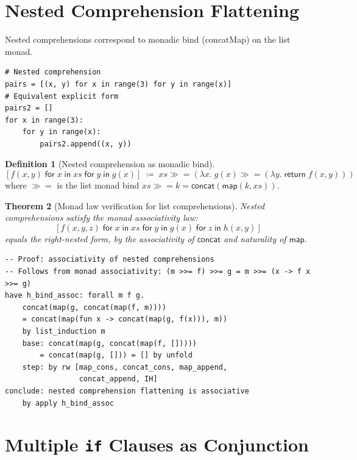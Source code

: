 \documentclass[11pt,a4paper]{report}
\theoremstyle{definition}
\newtheorem{definition}{Definition}[chapter]
\theoremstyle{plain}
\newtheorem{theorem}[definition]{Theorem}
\newcommand{\defeq}{\coloneqq}
\begin{document}
\section{Nested Comprehension Flattening}

Nested comprehensions correspond to monadic bind (concatMap) on the list
monad.

\begin{lstlisting}[style=python]
# Nested comprehension
pairs = [(x, y) for x in range(3) for y in range(x)]
# Equivalent explicit form
pairs2 = []
for x in range(3):
    for y in range(x):
        pairs2.append((x, y))
\end{lstlisting}

\begin{definition}[Nested comprehension as monadic bind]
\[
  [f(x,y) \;\mathsf{for}\; x \;\mathsf{in}\; \mathit{xs}
    \;\mathsf{for}\; y \;\mathsf{in}\; g(x)]
  \;\defeq\;
  \mathit{xs} \mathbin{\gg\!=} (\lambda x.\; g(x) \mathbin{\gg\!=}
    (\lambda y.\; \mathsf{return}\; f(x,y)))
\]
where $\gg\!=$ is the list monad bind
$\mathit{xs} \mathbin{\gg\!=} k = \mathsf{concat}(\mathsf{map}(k, \mathit{xs}))$.
\end{definition}

\begin{theorem}[Monad law verification for list comprehensions]
Nested comprehensions satisfy the monad associativity law:
\[
  [f(x,y,z) \;\mathsf{for}\; x \;\mathsf{in}\; \mathit{xs}
    \;\mathsf{for}\; y \;\mathsf{in}\; g(x)
    \;\mathsf{for}\; z \;\mathsf{in}\; h(x,y)]
\]
equals the right-nested form, by the associativity of $\mathsf{concat}$ and
naturality of $\mathsf{map}$.
\end{theorem}

\begin{lstlisting}[style=proof]
-- Proof: associativity of nested comprehensions
-- Follows from monad associativity: (m >>= f) >>= g = m >>= (x -> f x >>= g)
have h_bind_assoc: forall m f g.
    concat(map(g, concat(map(f, m))))
    = concat(map(fun x -> concat(map(g, f(x))), m))
    by list_induction m
    base: concat(map(g, concat(map(f, []))))
        = concat(map(g, [])) = [] by unfold
    step: by rw [map_cons, concat_cons, map_append,
                 concat_append, IH]
conclude: nested comprehension flattening is associative
    by apply h_bind_assoc
\end{lstlisting}

\section{Multiple \texttt{if} Clauses as Conjunction}
\end{document}
